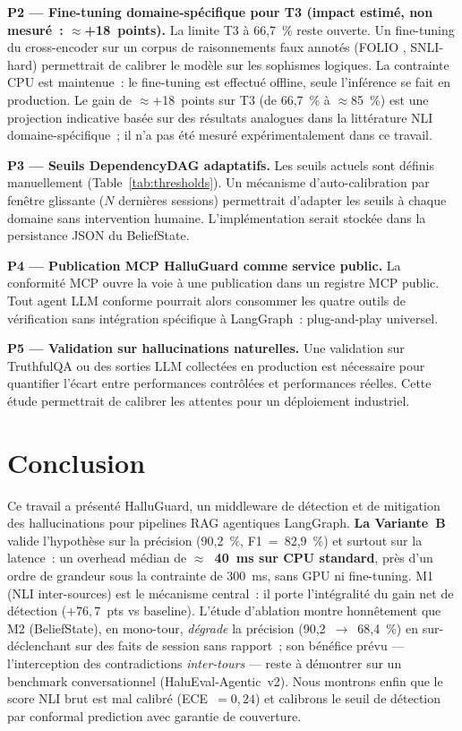 \documentclass[12pt,a4paper]{article}
\begin{document}
\textbf{P2 --- Fine-tuning domaine-spécifique pour T3 (impact estimé, non mesuré~: $\approx$+18~points).}
La limite T3 à 66,7~\% reste ouverte. Un fine-tuning du cross-encoder sur un corpus de raisonnements faux annotés (FOLIO \cite{han2022folio}, SNLI-hard) permettrait de calibrer le modèle sur les sophismes logiques. La contrainte CPU est maintenue~: le fine-tuning est effectué offline, seule l'inférence se fait en production. Le gain de $\approx$+18~points sur T3 (de 66,7~\% à $\approx$85~\%) est une projection indicative basée sur des résultats analogues dans la littérature NLI domaine-spécifique~; il n'a pas été mesuré expérimentalement dans ce travail.

\textbf{P3 --- Seuils DependencyDAG adaptatifs.}
Les seuils actuels sont définis manuellement (Table~\ref{tab:thresholds}). Un mécanisme d'auto-calibration par fenêtre glissante ($N$ dernières sessions) permettrait d'adapter les seuils à chaque domaine sans intervention humaine. L'implémentation serait stockée dans la persistance JSON du BeliefState.

\textbf{P4 --- Publication MCP HalluGuard comme service public.}
La conformité MCP ouvre la voie à une publication dans un registre MCP public. Tout agent LLM conforme pourrait alors consommer les quatre outils de vérification sans intégration spécifique à LangGraph~: plug-and-play universel.

\textbf{P5 --- Validation sur hallucinations naturelles.}
Une validation sur TruthfulQA \cite{lin2022truthfulqa} ou des sorties LLM collectées en production est nécessaire pour quantifier l'écart entre performances contrôlées et performances réelles. Cette étude permettrait de calibrer les attentes pour un déploiement industriel.

\section{Conclusion}

Ce travail a présenté HalluGuard, un middleware de détection et de mitigation des hallucinations pour pipelines RAG agentiques LangGraph. \textbf{La Variante~B} valide l'hypothèse sur la précision (90,2~\%, F1~=~82,9~\%) et surtout sur la latence~: un overhead médian de \textbf{$\approx$~40~ms sur CPU standard}, près d'un ordre de grandeur sous la contrainte de 300~ms, sans GPU ni fine-tuning. M1 (NLI inter-sources) est le mécanisme central~: il porte l'intégralité du gain net de détection ($+76{,}7$~pts vs baseline). L'étude d'ablation montre honnêtement que M2 (BeliefState), en mono-tour, \emph{dégrade} la précision (90,2~$\to$~68,4~\%) en sur-déclenchant sur des faits de session sans rapport~; son bénéfice prévu --- l'interception des contradictions \emph{inter-tours} --- reste à démontrer sur un benchmark conversationnel (HaluEval-Agentic~v2). Nous montrons enfin que le score NLI brut est mal calibré (ECE~$=0{,}24$) et calibrons le seuil de détection par conformal prediction avec garantie de couverture.
\end{document}
